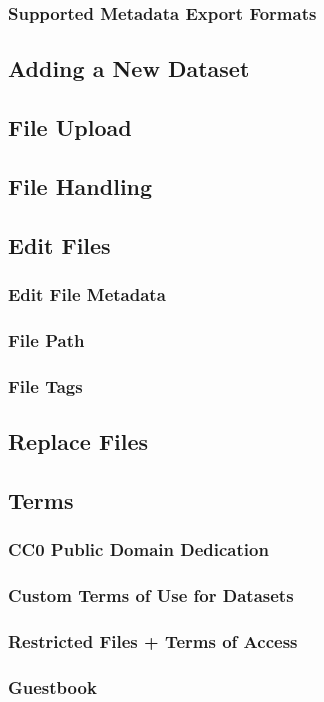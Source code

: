\documentclass[12pt,hidelinks]{article}
\begin{document}
        \subsubsection{Supported Metadata Export Formats}
    \subsection{Adding a New Dataset}
    \subsection{File Upload}
    \subsection{File Handling}
    \subsection{Edit Files}
        \subsubsection{Edit File Metadata}
        \subsubsection{File Path}
        \subsubsection{File Tags}
    \subsection{Replace Files}
    \subsection{Terms}
        \subsubsection{CC0 Public Domain Dedication}
        \subsubsection{Custom Terms of Use for Datasets}
        \subsubsection{Restricted Files + Terms of Access}
        \subsubsection{Guestbook}
\end{document}
